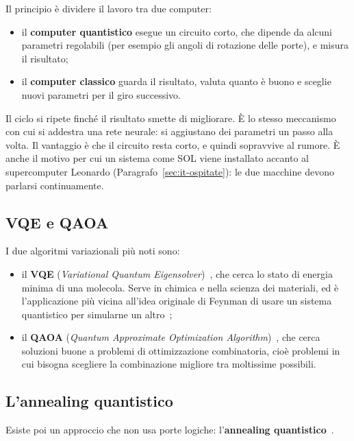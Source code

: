 Il principio è dividere il lavoro tra due computer:

\begin{itemize}
  \item il \textbf{computer quantistico} esegue un circuito corto, che
    dipende da alcuni parametri regolabili (per esempio gli angoli di
    rotazione delle porte), e misura il risultato;
  \item il \textbf{computer classico} guarda il risultato, valuta quanto è
    buono e sceglie nuovi parametri per il giro successivo.
\end{itemize}

Il ciclo si ripete finché il risultato smette di migliorare. È lo stesso
meccanismo con cui si addestra una rete neurale: si aggiustano dei parametri
un passo alla volta. Il vantaggio è che il circuito resta corto, e quindi
sopravvive al rumore. È anche il motivo per cui un sistema come SOL viene
installato accanto al supercomputer Leonardo (Paragrafo~\ref{sec:it-ospitate}):
le due macchine devono parlarsi continuamente.

\subsection{VQE e QAOA}
\label{subsec:alg-vqe-qaoa}

I due algoritmi variazionali più noti sono:

\begin{itemize}
  \item il \textbf{VQE} (\textit{Variational Quantum
    Eigensolver})~\cite{peruzzo2014vqe}, che cerca lo stato di energia minima
    di una molecola. Serve in chimica e nella scienza dei materiali, ed è
    l'applicazione più vicina all'idea originale di Feynman di usare un sistema
    quantistico per simularne un altro~\cite{feynman1982simulating};
  \item il \textbf{QAOA} (\textit{Quantum Approximate Optimization
    Algorithm})~\cite{farhi2014qaoa}, che cerca soluzioni buone a problemi di
    ottimizzazione combinatoria, cioè problemi in cui bisogna scegliere la
    combinazione migliore tra moltissime possibili.
\end{itemize}

\subsection{L'annealing quantistico}
\label{subsec:alg-annealing}

Esiste poi un approccio che non usa porte logiche: l'\textbf{annealing
quantistico}~\cite{kadowaki1998annealing}.

